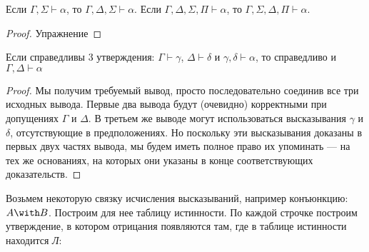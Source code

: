 \begin{lemma}\label{prefix_transposition}
Если $\Gamma, \Sigma \vdash \alpha$, то $\Gamma, \Delta, \Sigma \vdash \alpha$. 
Если $\Gamma, \Delta, \Sigma, \Pi \vdash \alpha$, то $\Gamma, \Sigma, \Delta, \Pi \vdash \alpha$. 
\end{lemma}

\begin{proof}Упражнение\end{proof}

\begin{lemma}
Если справедливы 3 утверждения: $\Gamma \vdash \gamma$, $\Delta \vdash \delta$ и
$\gamma, \delta \vdash \alpha$, то справедливо и $\Gamma, \Delta \vdash \alpha$
\end{lemma}

\begin{proof}

Мы получим требуемый вывод, просто последовательно соединив все три исходных 
вывода. Первые два вывода будут (очевидно) корректными при допущениях $\Gamma$ 
и $\Delta$. В третьем же выводе могут использоваться высказывания $\gamma$ и $\delta$,
отсутствующие в предположениях.
Но поскольку эти высказывания доказаны в первых двух частях вывода, мы будем
иметь полное право их упоминать --- на тех же основаниях, на которых они указаны
в конце соответствующих доказательств.

%

\end{proof}

Возьмем некоторую связку исчисления высказываний, например конъюнкцию: $A \with B$.
Построим для нее таблицу истинности. По каждой строчке построим утверждение,
в котором отрицания появляются там, где в таблице истинности находится \emph{Л}:

